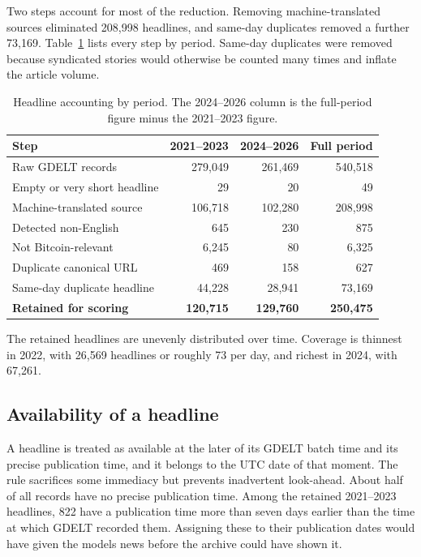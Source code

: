 Two steps account for most of the reduction. Removing machine-translated sources eliminated 208,998 headlines, and same-day duplicates removed a further 73,169. Table~\ref{tab:newsdrops} lists every step by period. Same-day duplicates were removed because syndicated stories would otherwise be counted many times and inflate the article volume.

\begin{table}[htbp]\centering\small
\caption{Headline accounting by period. The 2024--2026 column is the full-period figure minus the 2021--2023 figure.}\label{tab:newsdrops}
\begin{tabularx}{\textwidth}{Xrrr}
\toprule
Step & 2021--2023 & 2024--2026 & Full period\\\midrule
Raw GDELT records & 279,049 & 261,469 & 540,518\\
Empty or very short headline & 29 & 20 & 49\\
Machine-translated source & 106,718 & 102,280 & 208,998\\
Detected non-English & 645 & 230 & 875\\
Not Bitcoin-relevant & 6,245 & 80 & 6,325\\
Duplicate canonical URL & 469 & 158 & 627\\
Same-day duplicate headline & 44,228 & 28,941 & 73,169\\\midrule
\textbf{Retained for scoring} & \textbf{120,715} & \textbf{129,760} & \textbf{250,475}\\
\bottomrule
\end{tabularx}
\end{table}

The retained headlines are unevenly distributed over time. Coverage is thinnest in 2022, with 26,569 headlines or roughly 73 per day, and richest in 2024, with 67,261.

\subsection{Availability of a headline}
A headline is treated as available at the later of its GDELT batch time and its precise publication time, and it belongs to the UTC date of that moment. The rule sacrifices some immediacy but prevents inadvertent look-ahead. About half of all records have no precise publication time. Among the retained 2021--2023 headlines, 822 have a publication time more than seven days earlier than the time at which GDELT recorded them. Assigning these to their publication dates would have given the models news before the archive could have shown it.


